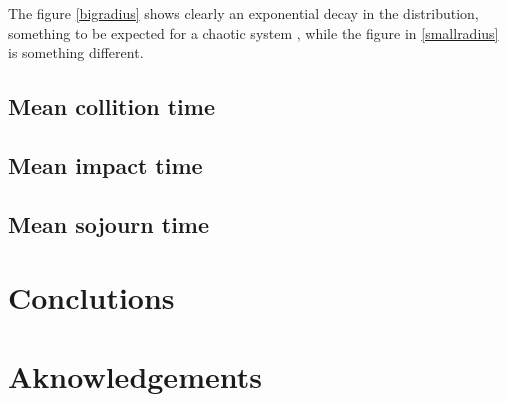 \documentclass[a4paper,10pt, jcp, aps, preprint]{revtex4-1}
\begin{document}
The figure \ref{bigradius} shows clearly an exponential decay in the
distribution, something to be expected for a chaotic system \cite{OttLibro} , while the
figure in \ref{smallradius} is something different. 

\subsection{Mean collition time}


\subsection{Mean impact time}

\subsection{Mean sojourn time}


\section{Conclutions}

\section{Aknowledgements}



\end{document}
